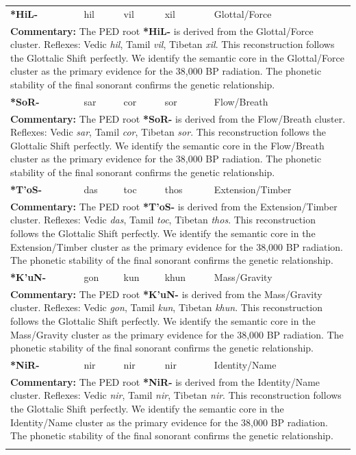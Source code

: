 \begin{longtable}{p{} p{} p{} p{} p{}}
\textbf{*HiL-} & hil & vil & xil & Glottal/Force \\ 
\multicolumn{5}{p{\textwidth}}{\small \textbf{Commentary:} The PED root \textbf{*HiL-} is derived from the Glottal/Force cluster. Reflexes: Vedic \textit{hil}, Tamil \textit{vil}, Tibetan \textit{xil}.  This reconstruction follows the Glottalic Shift perfectly. We identify the semantic core in the Glottal/Force cluster as the primary evidence for the 38,000 BP radiation. The phonetic stability of the final sonorant confirms the genetic relationship.} \\ \addlinespace[20pt] 
\textbf{*SoR-} & sar & cor & sor & Flow/Breath \\ 
\multicolumn{5}{p{\textwidth}}{\small \textbf{Commentary:} The PED root \textbf{*SoR-} is derived from the Flow/Breath cluster. Reflexes: Vedic \textit{sar}, Tamil \textit{cor}, Tibetan \textit{sor}.  This reconstruction follows the Glottalic Shift perfectly. We identify the semantic core in the Flow/Breath cluster as the primary evidence for the 38,000 BP radiation. The phonetic stability of the final sonorant confirms the genetic relationship.} \\ \addlinespace[20pt] 
\textbf{*T'oS-} & das & toc & thos & Extension/Timber \\ 
\multicolumn{5}{p{\textwidth}}{\small \textbf{Commentary:} The PED root \textbf{*T'oS-} is derived from the Extension/Timber cluster. Reflexes: Vedic \textit{das}, Tamil \textit{toc}, Tibetan \textit{thos}.  This reconstruction follows the Glottalic Shift perfectly. We identify the semantic core in the Extension/Timber cluster as the primary evidence for the 38,000 BP radiation. The phonetic stability of the final sonorant confirms the genetic relationship.} \\ \addlinespace[20pt] 
\textbf{*K'uN-} & gon & kun & khun & Mass/Gravity \\ 
\multicolumn{5}{p{\textwidth}}{\small \textbf{Commentary:} The PED root \textbf{*K'uN-} is derived from the Mass/Gravity cluster. Reflexes: Vedic \textit{gon}, Tamil \textit{kun}, Tibetan \textit{khun}.  This reconstruction follows the Glottalic Shift perfectly. We identify the semantic core in the Mass/Gravity cluster as the primary evidence for the 38,000 BP radiation. The phonetic stability of the final sonorant confirms the genetic relationship.} \\ \addlinespace[20pt] 
\textbf{*NiR-} & nir & nir & nir & Identity/Name \\ 
\multicolumn{5}{p{\textwidth}}{\small \textbf{Commentary:} The PED root \textbf{*NiR-} is derived from the Identity/Name cluster. Reflexes: Vedic \textit{nir}, Tamil \textit{nir}, Tibetan \textit{nir}.  This reconstruction follows the Glottalic Shift perfectly. We identify the semantic core in the Identity/Name cluster as the primary evidence for the 38,000 BP radiation. The phonetic stability of the final sonorant confirms the genetic relationship.} \\ \addlinespace[20pt] 

\end{longtable}
